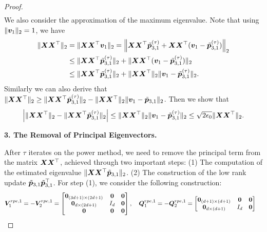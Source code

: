 \begin{proof}
\begin{align*}
    \end{align*}
    We also consider the approximation of the maximum eigenvalue. Note that using $\Vert\boldsymbol{v}_1\Vert_2=1$, we have 
    \begin{align*}
       \Vert\boldsymbol{X}\boldsymbol{X}^\top\Vert_2&=\Vert\boldsymbol{X}\boldsymbol{X}^\top\boldsymbol{v}_1\Vert_2=\left\Vert\boldsymbol{X}\boldsymbol{X}^\top\tilde{\boldsymbol{p}}_{3,1}^{(\tau)}+\boldsymbol{X}\boldsymbol{X}^\top(\boldsymbol{v}_1-\tilde{\boldsymbol{p}}_{3,1}^{(\tau)})\right\Vert_2\\
       &\leq\Vert\boldsymbol{X}\boldsymbol{X}^\top\tilde{\boldsymbol{p}}_{3,1}^{(\tau)}\Vert_2+\Vert\boldsymbol{X}\boldsymbol{X}^\top(\boldsymbol{v}_1-\tilde{\boldsymbol{p}}_{3,1}^{(\tau)})\Vert_2\\
       &\leq\Vert\boldsymbol{X}\boldsymbol{X}^\top\tilde{\boldsymbol{p}}_{3,1}^{(\tau)}\Vert_2+\Vert\boldsymbol{X}\boldsymbol{X}^\top\Vert_2\Vert\boldsymbol{v}_1-\tilde{\boldsymbol{p}}_{3,1}^{(\tau)}\Vert_2.
   \end{align*}
   Similarly we can also derive that $\Vert\boldsymbol{X}\boldsymbol{X}^\top\Vert_2\geq \Vert\boldsymbol{X}\boldsymbol{X}^\top\tilde{\boldsymbol{p}}_{3,1}^{(\tau)}\Vert_2-\Vert\boldsymbol{X}\boldsymbol{X}^\top\Vert_2\Vert\boldsymbol{v}_1-\tilde{\boldsymbol{p}}_{3,1}\Vert_2$. Then we show that
   \begin{align*}
       \Big|\Vert\boldsymbol{X}\boldsymbol{X}^\top\Vert_2-\Vert\boldsymbol{X}\boldsymbol{X}^\top\tilde{\boldsymbol{p}}_{3,1}^{(\tau)}\Vert_2\Big|\leq\Vert\boldsymbol{X}\boldsymbol{X}^\top\Vert_2\Vert\boldsymbol{v}_1-\tilde{\boldsymbol{p}}_{3,1}^{(\tau)}\Vert_2\leq\sqrt{2\epsilon_0}\Vert\boldsymbol{X}\boldsymbol{X}^\top\Vert_2.
   \end{align*}
    \begin{center}
        \textbf{3. The Removal of Principal Eigenvectors.}
    \end{center}
    After $\tau$ iterates on the power method, we need to remove the principal term from the matrix $\boldsymbol{X}\boldsymbol{X}^\top$, achieved through two important steps: (1) The computation of the estimated eigenvalue $\Vert\boldsymbol{X}\boldsymbol{X}^\top\tilde{\boldsymbol{p}}_{3,1}\Vert_2$. (2) The construction of the low rank update $\tilde{\boldsymbol{p}}_{3,1}\tilde{\boldsymbol{p}}_{3,1}^\top$. For step (1), we consider the following construction:
    \begin{align*}
        &\boldsymbol{V}_1^{rpe,1}=-\boldsymbol{V}_2^{rpe,1}=\begin{bmatrix}
            \boldsymbol{0}_{(3d+1)\times(2d+1)}&\boldsymbol{0}&\boldsymbol{0}\\
            \boldsymbol{0}_{d\times(2d+1)}&I_d&\boldsymbol{0}\\
            \boldsymbol{0}&\boldsymbol{0}&\boldsymbol{0}
        \end{bmatrix},\quad\boldsymbol{Q}_1^{rpe,1} =-\boldsymbol{Q}_2^{rpe,1}= \begin{bmatrix}
            \boldsymbol{0}_{(d+1)\times(d+1)}&\boldsymbol{0}&\boldsymbol{0}\\
            \boldsymbol{0}_{d\times(d+1)}& I_d&\boldsymbol{0}\\

\end{bmatrix}
\end{align*}
\end{proof}
